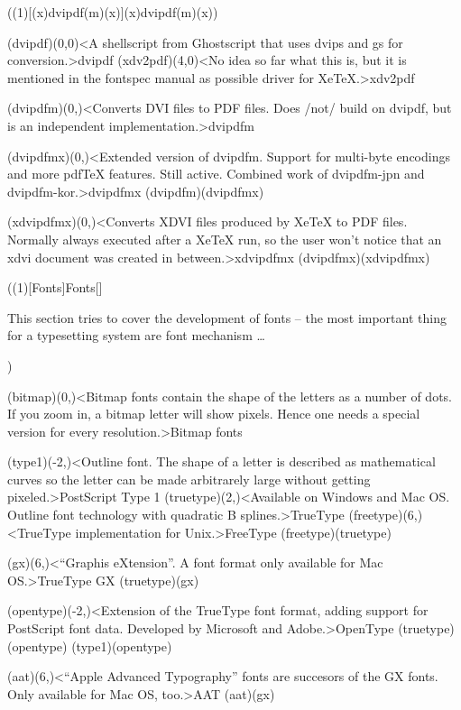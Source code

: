 \tograph(\tostruct(1)[{(x)dvipdf(m)(x)}]{(x)dvipdf(m)(x)}){
	\tonode(dvipdf)(0,0)<A shellscript from Ghostscript that uses dvips and gs for conversion.>{dvipdf}
	\tonode(xdv2pdf)(4,0)<No idea so far what this is, but it is mentioned in the fontspec manual as possible driver for XeTeX.>{xdv2pdf}
	\steplayer

	\tonode(dvipdfm)(0,\layer)<Converts DVI files to PDF files. Does /not/ build on dvipdf, but is an independent implementation.>{dvipdfm}
	\steplayer

	\tonode(dvipdfmx)(0,\layer)<Extended version of dvipdfm. Support for multi-byte encodings and more pdfTeX features. Still active. Combined work of dvipdfm-jpn and dvipdfm-kor.>{dvipdfmx}
	\todraw(dvipdfm)(dvipdfmx)
	\steplayer

	\tonode(xdvipdfmx)(0,\layer)<Converts XDVI files produced by XeTeX to PDF files. Normally always executed after a XeTeX run, so the user won't notice that an xdvi document was created in between.>{xdvipdfmx}
	\todraw(dvipdfmx)(xdvipdfmx)
}

\tograph(\tostruct(1)[Fonts]{Fonts}[\fonttechnology]
\parbox{\textwidth}{\large
This section tries to cover the development of fonts – the most important thing for a typesetting system are font mechanism …\\[4ex]}
){
	\tonode(bitmap)(0,\layer)<Bitmap fonts contain the shape of the letters as a number of dots. If you zoom in, a bitmap letter will show pixels. Hence one needs a special version for every resolution.>{Bitmap fonts}
	\steplayer[-3]

	\tonode(type1)(-2,\layer)<Outline font. The shape of a letter is described as mathematical curves so the letter can be made arbitrarely large without getting pixeled.>{PostScript Type 1}
	\tonode(truetype)(2,\layer)<Available on Windows and Mac OS. Outline font technology with quadratic B splines.>{TrueType}
	\tonode(freetype)(6,\layer)<TrueType implementation for Unix.>{FreeType}
	\todraw(freetype)(truetype)
	\steplayer[-3]

	\tonode(gx)(6,\layer)<“Graphis eXtension”. A font format only available for Mac OS.>{TrueType GX}
	\todraw(truetype)(gx)
	\steplayer[-3]

	\tonode(opentype)(-2,\layer)<Extension of the TrueType font format, adding support for PostScript font data. Developed by Microsoft and Adobe.>{OpenType}
	\todraw(truetype)(opentype)
	\todraw(type1)(opentype)

	\tonode(aat)(6,\layer)<“Apple Advanced Typography” fonts are succesors of the GX fonts. Only available for Mac OS, too.>{AAT}
	\todraw(aat)(gx)
}

